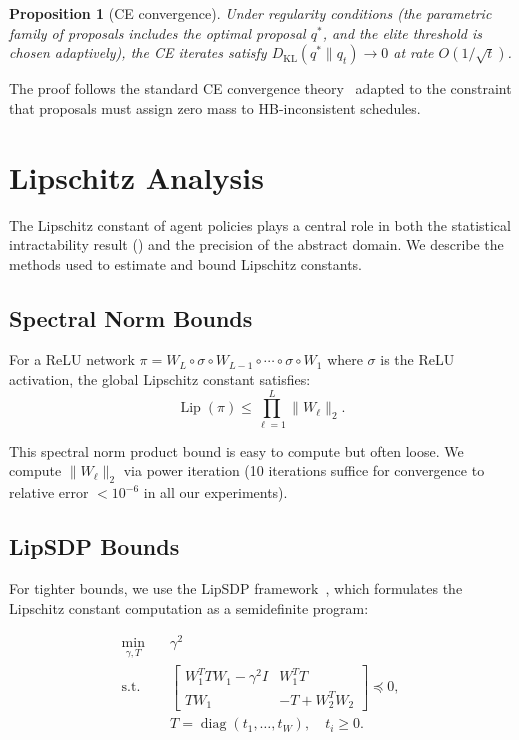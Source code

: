 \documentclass[11pt]{article}
\newtheorem{proposition}[theorem]{Proposition}
\newcommand{\norm}[1]{\lVert #1 \rVert}
\DeclareMathOperator{\diag}{diag}
\DeclareMathOperator{\Lip}{Lip}
\begin{document}
\begin{proposition}[CE convergence]
\label{prop:ce-conv}
Under regularity conditions (the parametric family of proposals includes
the optimal proposal $q^*$, and the elite threshold is chosen adaptively),
the CE iterates satisfy $D_{\text{KL}}(q^* \| q_t) \to 0$ at rate
$O(1/\sqrt{t})$.
\end{proposition}

The proof follows the standard CE convergence theory~\cite{rubinstein2004cross}
adapted to the constraint that proposals must assign zero mass to
HB-inconsistent schedules.


\section{Lipschitz Analysis}
\label{app:lipschitz}

The Lipschitz constant of agent policies plays a central role in both
the statistical intractability result () and the
precision of the abstract domain. We describe the methods used to estimate
and bound Lipschitz constants.

\subsection{Spectral Norm Bounds}

For a ReLU network $\pi = W_L \circ \sigma \circ W_{L-1} \circ \cdots \circ \sigma \circ W_1$
where $\sigma$ is the ReLU activation, the global Lipschitz constant satisfies:
\[
  \Lip(\pi) \leq \prod_{\ell=1}^{L} \norm{W_\ell}_2.
\]

This spectral norm product bound is easy to compute but often loose.
We compute $\norm{W_\ell}_2$ via power iteration (10 iterations suffice
for convergence to relative error $< 10^{-6}$ in all our experiments).

\subsection{LipSDP Bounds}

For tighter bounds, we use the LipSDP framework~\cite{fazlyab2019efficient},
which formulates the Lipschitz constant computation as a semidefinite program:

\begin{align}
  \min_{\gamma, T} \quad & \gamma^2 \\
  \text{s.t.} \quad &
  \begin{bmatrix} W_1^T T W_1 - \gamma^2 I & W_1^T T \\ T W_1 & -T + W_2^T W_2 \end{bmatrix}
  \preceq 0, \\
  & T = \diag(t_1, \ldots, t_W), \quad t_i \geq 0.
\end{align}
\end{document}
